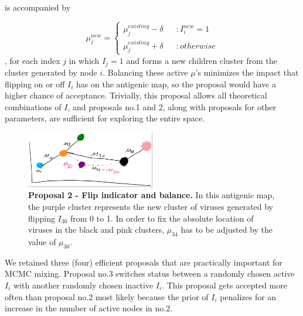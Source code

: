 \documentclass[11pt,oneside,letterpaper]{article}
\begin{document}
is accompanied by 

\begin{equation}
\label{muBalance-equation}
	\mu_j^{new} =  \left \{
\begin{array}{lllr}
    \mu_j^{existing} - \delta		& &	: I_i^{new} = 1\\
    \mu_j^{existing} + \delta	& &	: otherwise
\end{array}
\right.
\end{equation},
for each index $j$ in which $I_j = 1 $  and forms a new children cluster from the cluster generated by node $i$. Balancing these active $\mu$'s minimizes the impact that flipping on or off $I_i$ has on the antigenic map, so the proposal would have a higher chance of acceptance. Trivially, this proposal allows all theoretical combinations of $I$, and proposals no.1 and 2, along with proposals for other parameters, are sufficient for exploring the entire space.



\begin{figure}[h]
	\centering		
	\includegraphics[width=0.5\textwidth]{figures/flipAndBalance}
	\caption{\textbf{Proposal 2 - Flip indicator and balance.} 
In this antigenic map, the purple cluster represents the new cluster of viruses generated by flipping $I_{30}$ from 0 to 1. In order to fix the absolute location of viruses in the black and pink clusters,  $\mu_34$ has to be adjusted by the value of $\mu_{30}$.
	} 
	\label{flipAndBalance} 
\end{figure}



We retained three (four) efficient proposals that are practically important for MCMC mixing. 
Proposal no.3 switches status between a randomly chosen active $I_i$ with another randomly chosen inactive $I_i$. 
This proposal gets accepted more often than proposal no.2 most likely because the prior of $I_i$ penalizes for an increase in the number of active nodes in no.2.
\end{document}
